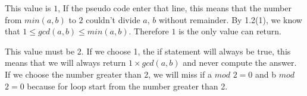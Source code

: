 \documentclass[11pt]{homework}
\begin{document}
\begin{arabicpartsdsa}
\begin{arabicpartsdsasec}
        \end{arabicpartsdsasec}

    \item 

        This value is \(1\), If the pseudo code enter that line, this means that the
        number from \(min(a, b)\) to \(2\) couldn't divide \(a\), \(b\) without remainder. By
        1.2(1), we know that \(1 \leq gcd(a, b) \leq min(a, b)\).
        Therefore \(1\) is the only value can return.

    \item 

        This value must be 2. If we choose 1, the if statement will always be
        true, this means that we will always return \(1 \times gcd(a, b)\) and never
        compute the answer. If we choose the number greater than 2, we will miss
        if a \(mod\) \(2 = 0\) and b \(mod\) \(2 = 0\) because for loop start from the number
        greater than 2.

  \end{arabicpartsdsa}

\pagebreak

\question
\end{document}
